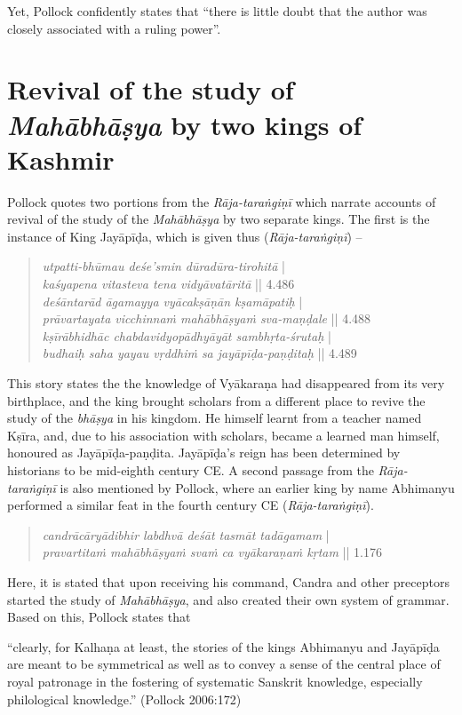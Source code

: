 Yet, Pollock confidently states that ``there is little doubt that the author was closely associated with a ruling power''. 

\section{Revival of the study of {{\sl\bfseries Mahābhāṣya}} by two kings of Kashmir}\label{chap3-sec12}

Pollock quotes two portions from the {\sl Rāja-taraṅgiṇī} which narrate accounts of revival of the study of the {\sl Mahābhāṣya} by two separate kings. The first is the instance of King Jayāpīḍa,  which is given thus ({\sl Rāja-taraṅgiṇī}) --
\begin{quote}
{{\sl utpatti-bhūmau deśe’smin dūradūra-tirohitā}} |\\[2pt]
{{\sl kaśyapena vitasteva tena vidyāvatāritā}} || 4.486\\[2pt]
{{\sl deśāntarād āgamayya vyācakṣāṇān kṣamāpatiḥ}} |\\[2pt] 
{{\sl prāvartayata vicchinnaṁ mahābhāṣyaṁ sva-maṇḍale}} || 4.488\\[2pt]
{{\sl kṣīrābhidhāc chabdavidyopādhyāyāt sambhṛta-śrutaḥ}} |\\[2pt]
{{\sl budhaiḥ saha yayau vṛddhiṁ sa jayāpīḍa-paṇḍitaḥ}} || 4.489  
\end{quote}
This story states the the knowledge of Vyākaraṇa had disappeared from its very birthplace, and the king brought scholars from a different place to revive the study of the {\sl bhāṣya} in his kingdom. He himself learnt from a teacher named Kṣīra, and, due to his association with scholars, became a learned man himself, honoured as Jayāpīḍa-paṇḍita. Jayāpīḍa's reign has been determined by historians to be mid-eighth century CE. A second passage from the {\sl Rāja-taraṅgiṇī} is also mentioned by Pollock, where an earlier king by name Abhimanyu performed a similar feat in the fourth century CE ({\sl Rāja-taraṅgiṇī}).
\begin{quote}
{{\sl candrācāryādibhir labdhvā deśāt tasmāt tadāgamam}} |\\ 
{{\sl pravartitaṁ mahābhāṣyaṁ svaṁ ca vyākaraṇaṁ kṛtam}} || 1.176
\end{quote}
Here, it is stated that upon receiving his command, Candra and other preceptors started the study of {\sl Mahābhāṣya}, and also created their own system of grammar. Based on this, Pollock states that 
\begin{myquote}
``clearly, for Kalhaṇa  at least, the stories of the kings Abhimanyu and Jayāpīḍa are meant to be symmetrical as well as to convey a sense of the central place of royal patronage in the fostering of systematic Sanskrit knowledge, especially philological knowledge.''
\hfill (Pollock 2006:172)
\end{myquote}
